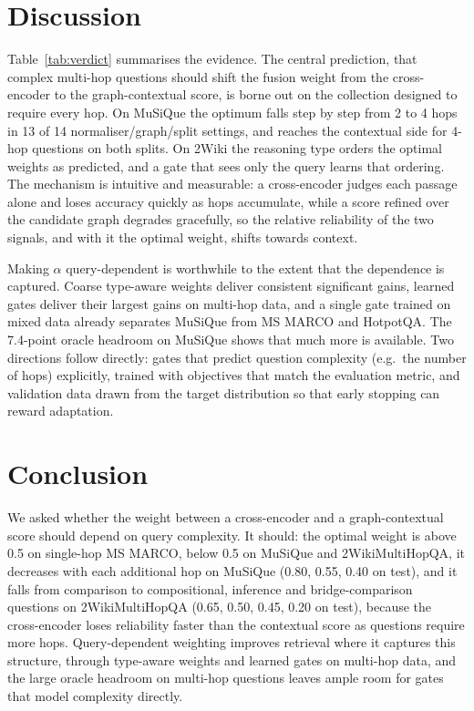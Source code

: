 \documentclass[11pt]{article}
\begin{document}
\FloatBarrier

\section{Discussion}
\label{sec:discussion}


Table~\ref{tab:verdict} summarises the evidence. The central prediction, that complex multi-hop questions
should shift the fusion weight from the cross-encoder to the graph-contextual score, is borne out on the
collection designed to require every hop. On MuSiQue the optimum falls step by step from 2 to 4 hops in 13 of
14 normaliser/graph/split settings, and reaches the contextual side for 4-hop questions on both splits. On
2Wiki the reasoning type orders the optimal weights as predicted, and a gate that sees only the query learns
that ordering. The mechanism is intuitive and measurable: a cross-encoder judges each passage alone and
loses accuracy quickly as hops accumulate, while a score refined over the candidate graph degrades
gracefully, so the relative reliability of the two signals, and with it the optimal weight, shifts towards
context.

Making $\alpha$ query-dependent is worthwhile to the extent that the dependence is captured. Coarse
type-aware weights deliver consistent significant gains, learned gates deliver their largest gains on
multi-hop data, and a single gate trained on mixed data already separates MuSiQue from MS MARCO and
HotpotQA. The 7.4-point oracle headroom on MuSiQue shows that much more is available. Two directions follow
directly: gates that predict question complexity (e.g.\ the number of hops) explicitly, trained with
objectives that match the evaluation metric, and validation data drawn from the target distribution so that
early stopping can reward adaptation.

\section{Conclusion}
\label{sec:conclusion}
We asked whether the weight between a cross-encoder and a graph-contextual score should depend on query
complexity. It should: the optimal weight is above 0.5 on single-hop MS MARCO, below 0.5 on MuSiQue and
2WikiMultiHopQA, it decreases with each additional hop on MuSiQue (0.80, 0.55, 0.40 on test), and it falls from
comparison to compositional, inference and bridge-comparison questions on 2WikiMultiHopQA (0.65, 0.50, 0.45,
0.20 on test), because the cross-encoder loses
reliability faster than the contextual score as questions require more hops. Query-dependent weighting
improves retrieval where it captures this structure, through type-aware weights and learned gates on
multi-hop data, and the large oracle headroom on multi-hop questions leaves ample room for gates that model
complexity directly.
\end{document}
